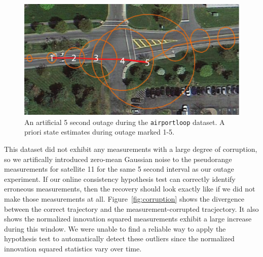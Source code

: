 \begin{figure}[!t]
\includegraphics[width=\columnwidth]{outage}
\caption{An artificial 5 second outage during the \texttt{airportloop} dataset.  A priori state estimates during outage marked 1-5.}
\label{fig:outage}
\end{figure}

This dataset did not exhibit any measurements with a large degree of corruption, so we artifically introduced zero-mean Gaussian noise to the pseudorange measurements for satellite 11 for the same 5 second interval as our outage experiment.  If our online consistency hypothesis test can correctly identify erroneous measurements, then the recovery should look exactly like if we did not make those measurements at all.  Figure~\ref{fig:corruption} shows the divergence between the correct trajectory and the measurement-corrupted tracjectory.  It also shows the normalized innovation squared measurements exhibit a large increase during this window.  We were unable to find a reliable way to apply the hypothesis test to automatically detect these outliers since the normalized innovation squared statistics vary over time.

